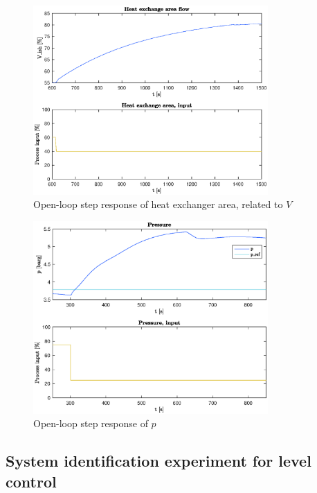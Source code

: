 \documentclass[12pt]{article}
\begin{document}
\begin{figure}[p]
\centering
\includegraphics[width=0.8\textwidth]{../Systemanalyse/Log_Data_to_Matlab/Figurer/Stegeksperimenter/LC1028.eps}
\caption{Open-loop step response of heat exchanger area, related to $V$}
\label{fig:ol_step_LC1028}
\end{figure}

\begin{figure}[p]
\centering
\includegraphics[width=0.8\textwidth]{../Systemanalyse/Log_Data_to_Matlab/Figurer/Stegeksperimenter/PC1024.eps}
\caption{Open-loop step response of $p$}
\label{fig:ol_step_PC1024}
\end{figure}

\subsection{System identification experiment for level control}
\end{document}

